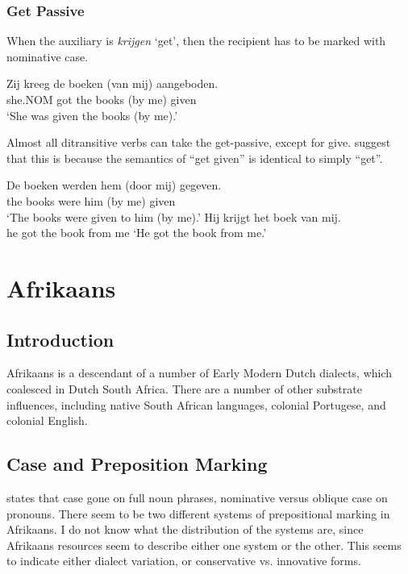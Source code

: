 \subsubsection{Get Passive}
When the auxiliary is \emph{krijgen} `get', then the recipient has to be marked with nominative case.
\begin{exe}
\ex \gll Zij kreeg de boeken (van mij) aangeboden.\\
she.NOM got the books (by me) given\\
\trans `She was given the books (by me).' \citep[ex. 7]{Broekhuis.1994}
\end{exe}
Almost all ditransitive verbs can take the get-passive, except for give. \cite{Broekhuis.1994} suggest that this is because the semantics of ``get given'' is identical to simply ``get''. 
\begin{exe}
\ex \gll De boeken werden hem (door mij) gegeven.\\
the books were him (by me) given \\
\trans `The books were given to him (by me).' \citep[ex 11b]{Broekhuis.1994}
\ex Hij krijgt het boek van mij.\\
he got the book from me
\trans `He got the book from me.' \citep[ex 12]{Broekhuis.1994}
\end{exe}

\section{Afrikaans}\label{sec:Afrikaans}
\subsection{Introduction}
Afrikaans is a descendant of a number of Early Modern Dutch dialects, which coalesced in Dutch South Africa. There are a number of other substrate influences, including native South African languages, colonial Portugese, and colonial English.
\subsection{Case and Preposition Marking}
\cite{Stadler.1996} states that case gone on full noun phrases, nominative versus oblique case on pronouns. There seem to be two different systems of prepositional marking in Afrikaans. I do not know what the distribution of the systems are, since Afrikaans resources seem to describe either one system or the other. This seems to indicate either dialect variation, or conservative vs. innovative forms.

